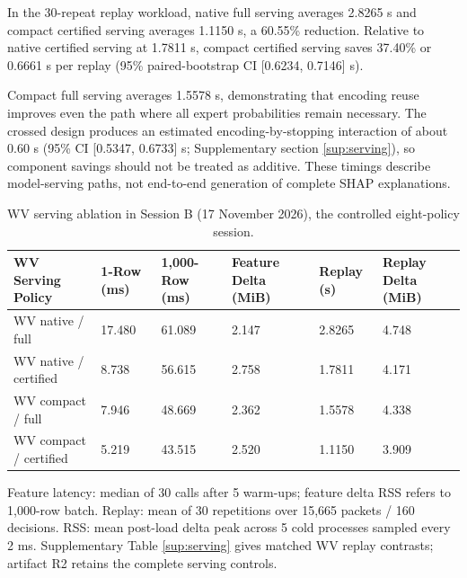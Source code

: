 \documentclass[final,3p,10pt,nopreprintline]{elsarticle}
\begin{document}
In the 30-repeat replay workload, native full serving averages 2.8265 s and compact certified serving averages 1.1150 s, a 60.55\% reduction. Relative to native certified serving at 1.7811 s, compact certified serving saves 37.40\% or 0.6661 s per replay (95\% paired-bootstrap CI [0.6234, 0.7146] s).

Compact full serving averages 1.5578 s, demonstrating that encoding reuse improves even the path where all expert probabilities remain necessary. The crossed design produces an estimated encoding-by-stopping interaction of about 0.60 s (95\% CI [0.5347, 0.6733] s; Supplementary section \ref*{sup:serving}), so component savings should not be treated as additive. These timings describe model-serving paths, not end-to-end generation of complete SHAP explanations.

\begin{table}[H]\centering\small\setlength{\tabcolsep}{3pt}\renewcommand{\arraystretch}{1.13}
\caption{WV serving ablation in Session B (17 November 2026), the controlled eight-policy session.}\label{tab:runtime}
\begin{tabular}{L{0.24\dimexpr{}\tabcolsep\relax}L{0.14\dimexpr{}\tabcolsep\relax}L{0.15\dimexpr{}\tabcolsep\relax}L{0.16\dimexpr{}\tabcolsep\relax}L{0.14\dimexpr{}\tabcolsep\relax}L{0.17\dimexpr{}\tabcolsep\relax}}\toprule
\textbf{WV Serving Policy} & \textbf{1-Row (ms)} & \textbf{1,000-Row (ms)} & \textbf{Feature Delta (MiB)} & \textbf{Replay (s)} & \textbf{Replay Delta (MiB)}\\\midrule
WV native / full & 17.480 & 61.089 & 2.147 & 2.8265 & 4.748\\
WV native / certified & 8.738 & 56.615 & 2.758 & 1.7811 & 4.171\\
WV compact / full & 7.946 & 48.669 & 2.362 & 1.5578 & 4.338\\
WV compact / certified & 5.219 & 43.515 & 2.520 & 1.1150 & 3.909\\
\bottomrule\end{tabular}
\end{table}

Feature latency: median of 30 calls after 5 warm-ups; feature delta RSS refers to 1,000-row batch. Replay: mean of 30 repetitions over 15,665 packets / 160 decisions. RSS: mean post-load delta peak across 5 cold processes sampled every 2 ms. Supplementary Table \ref*{sup:serving} gives matched WV replay contrasts; artifact R2 retains the complete serving controls.
\end{document}
